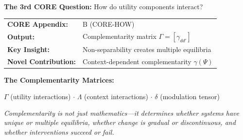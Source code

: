 \begin{tcolorbox}[
    colback=blue!5!white,
    colframe=blue!75!black,
    title={\textbf{10C CORE Connection: HOW (Question 3)}},
    fonttitle=\bfseries
]
\textbf{The 3rd CORE Question:} How do utility components interact?

\medskip
\begin{tabular}{ll}
\textbf{CORE Appendix:} & B (CORE-HOW) \\
\textbf{Output:} & Complementarity matrix $\Gamma = [\gamma_{dd'}]$ \\
\textbf{Key Insight:} & Non-separability creates multiple equilibria \\
\textbf{Novel Contribution:} & Context-dependent complementarity $\gamma(\Psi)$
\end{tabular}

\medskip
\textbf{The Complementarity Matrices:}
\begin{center}
\small
$\Gamma$ (utility interactions) $\cdot$ $\Lambda$ (context interactions) $\cdot$ $\delta$ (modulation tensor)
\end{center}

\textit{Complementarity is not just mathematics---it determines whether systems have unique or multiple equilibria, whether change is gradual or discontinuous, and whether interventions succeed or fail.}
\end{tcolorbox}

